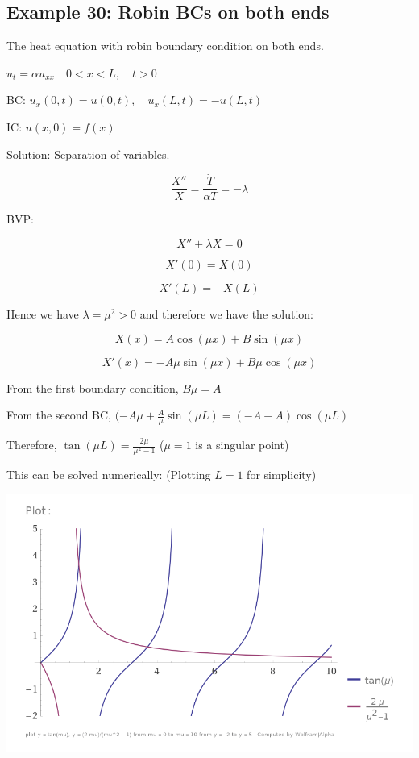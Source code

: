 \documentclass{article}
\begin{document}
\subsection{Example 30: Robin BCs on both ends}

The heat equation with robin boundary condition on both ends. 

$u_t = \alpha u_{xx} \quad 0 
< x < L, \quad t > 0$

BC: $u_x(0,t) = u(0,t), \quad u_x (L,t) = - u(L,t)$

IC: $u(x,0) = f(x)$

Solution: Separation of variables. 

$$\frac{X''}{X} = \frac{\dot{T}}{\alpha T} = - \lambda$$

BVP:

$$X'' + \lambda X = 0$$

$$X'(0) = X(0)$$

$$X'(L) = - X(L)$$

Hence we have $\lambda = \mu^2 > 0$ and therefore we have the solution:

$$X(x) = A \cos(\mu x) + B \sin(\mu x)$$

$$X'(x) = - A \mu \sin(\mu x) + B \mu \cos(\mu x)$$

From the first boundary condition, $B \mu = A$


From the second BC, $(- A \mu + \frac{A}{\mu} \sin(\mu L) = (-A - A) \cos(\mu L)$

Therefore, $\tan(\mu L) = \frac{2 \mu}{\mu^2 - 1}$ ($\mu = 1$ is a singular point)

This can be solved numerically: (Plotting $L = 1$ for simplicity)

\begin{center}
    \includegraphics[width = 0.9 \textwidth]{7.png}
\end{center}
\end{document}
